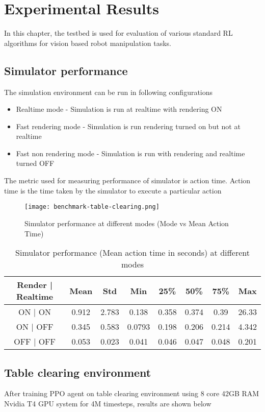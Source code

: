 \chapter{Experimental Results}
In this chapter, the testbed is used for evaluation of various standard RL algorithms for vision based robot manipulation tasks.

\section{Simulator performance}
The simulation environment can be run in following configurations

\begin{itemize}
	\item Realtime mode - Simulation is run at realtime with rendering ON
	\item Fast rendering mode - Simulation is run rendering turned on but not at realtime
	\item Fast non rendering mode - Simulation is run with rendering and realtime turned OFF
\end{itemize}

The metric used for measuring performance of simulator is action time. Action time is the time taken by the simulator to execute a particular action

\begin{figure}
	\caption{Simulator performance at different modes (Mode vs Mean Action Time)}
	\centering
	\texttt{[image: benchmark-table-clearing.png]}
\end{figure}

\begin{table}
	\caption{Simulator performance (Mean action time in seconds) at different modes}
	\begin{tabular}{|c|c|c|c|c|c|c|c|}
		\hline
		\textbf{Render | Realtime} & \textbf{Mean} & \textbf{Std} & \textbf{Min} & \textbf{25\%} & \textbf{50\%} & \textbf{75\%} & \textbf{Max} \\
		\hline
		ON | ON & 0.912 & 2.783 & 0.138 & 0.358 & 0.374 & 0.39 & 26.33 \\
		\hline
		ON | OFF & 0.345 & 0.583 & 0.0793 & 0.198 & 0.206 & 0.214 & 4.342 \\
		\hline
		OFF | OFF & 0.053 & 0.023 & 0.041 & 0.046 & 0.047 & 0.048 & 0.201 \\
		\hline
	\end{tabular}
\end{table}

\section{Table clearing environment}
After training PPO agent on table clearing environment using 8 core 42GB RAM Nvidia T4 GPU system for 4M timesteps, results are shown below

